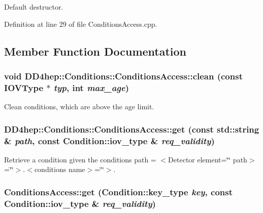 Default destructor. 

Definition at line 29 of file ConditionsAccess.cpp.

\subsection{Member Function Documentation}
\hypertarget{class_d_d4hep_1_1_conditions_1_1_conditions_access_af8320af218167cfc28bf10763cc64f94}{
\subsubsection[{clean}]{\setlength{\rightskip}{0pt plus 5cm}void DD4hep::Conditions::ConditionsAccess::clean (const {\bf IOVType} $\ast$ {\em typ}, \/  int {\em max\_\-age})}}
\label{class_d_d4hep_1_1_conditions_1_1_conditions_access_af8320af218167cfc28bf10763cc64f94}


Clean conditions, which are above the age limit. \hypertarget{class_d_d4hep_1_1_conditions_1_1_conditions_access_a274b4e414739ec7bf648075a2f64f0d0}{
\subsubsection[{get}]{ DD4hep::Conditions::ConditionsAccess::get (const std::string \& {\em path}, \/  const {\bf Condition::iov\_\-type} \& {\em req\_\-validity})}}
\label{class_d_d4hep_1_1_conditions_1_1_conditions_access_a274b4e414739ec7bf648075a2f64f0d0}


Retrieve a condition given the conditions path = $<$Detector element=\char`\"{}\char`\"{} path$>$=\char`\"{}\char`\"{}$>$.$<$conditions name$>$=\char`\"{}\char`\"{}$>$. \hypertarget{class_d_d4hep_1_1_conditions_1_1_conditions_access_a9adb922d63cdbb66043c5aaf90fe0a20}{
\subsubsection[{get}]{ ConditionsAccess::get ({\bf Condition::key\_\-type} {\em key}, \/  const {\bf Condition::iov\_\-type} \& {\em req\_\-validity})}}
\label{class_d_d4hep_1_1_conditions_1_1_conditions_access_a9adb922d63cdbb66043c5aaf90fe0a20}


